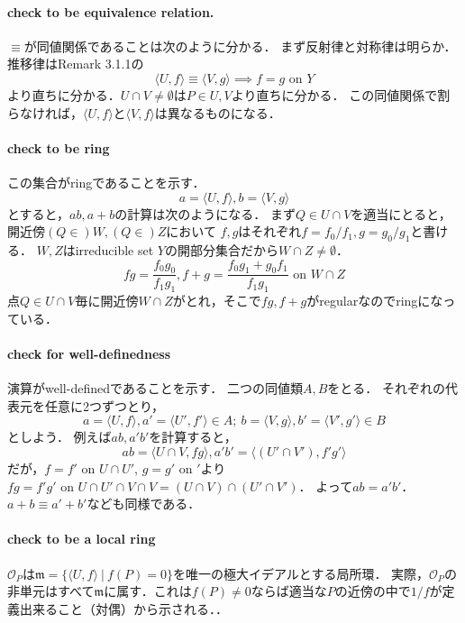 \documentclass[a4paper]{jarticle}
\newcommand{\I}[1]{\mathfrak{#1}}
\begin{document}
    \paragraph{check to be equivalence relation.}
    $\equiv$が同値関係であることは次のように分かる．
    まず反射律と対称律は明らか．
    推移律はRemark 3.1.1の
    \[ \langle U,f \rangle \equiv \langle V,g \rangle \implies f=g \mbox{ on } Y  \]
    より直ちに分かる．$U \cap V \neq \emptyset$は$P \in U, V$より直ちに分かる．
    この同値関係で割らなければ，$\langle U,f \rangle$と$\langle V,f \rangle$は異なるものになる．

    \paragraph{check to be ring}
    この集合がringであることを示す．
    \[ a=\langle U,f \rangle, b=\langle V,g \rangle \]
    とすると，$ab, a+b$の計算は次のようになる．
    まず$Q \in U \cap V$を適当にとると，開近傍$(Q \in )W, (Q \in )Z$において
    $f,g$はそれぞれ$f=f_0/f_1, g=g_0/g_1$と書ける．
    $W,Z$はirreducible set $Y$の開部分集合だから$W \cap Z \neq \emptyset$．
    \[ fg=\frac{f_0 g_0}{f_1 g_1}, f+g=\frac{f_0 g_1+g_0 f_1}{f_1 g_1} \mbox{ on } W \cap Z \]
    点$Q \in U \cap V$毎に開近傍$W \cap Z$がとれ，そこで$fg, f+g$がregularなのでringになっている．
    
    \paragraph{check for well-definedness}
    演算がwell-definedであることを示す．
    二つの同値類$A, B$をとる．
    それぞれの代表元を任意に2つずつとり，
    \[ a=\langle U,f \rangle, a'=\langle U',f' \rangle \in A;~ b=\langle V,g \rangle, b'=\langle V',g' \rangle \in B\]
    としよう．
    例えば$ab, a'b'$を計算すると，
    \[ ab=\langle U \cap V,fg \rangle, a'b'=\langle (U' \cap V'),f'g' \rangle \]
    だが，$f=f' \mbox{ on } U \cap U'$, $g=g' \mbox{ on } '$より
    $fg=f'g' \mbox{ on } U \cap U' \cap V \cap V=(U \cap V) \cap (U' \cap V')$．
    よって$ab=a'b'$．
    $a+b \equiv a'+b'$なども同様である．
    
    \paragraph{check to be a local ring}
    $\mathcal{O}_P$は$\I{m}=\{ \langle U,f \rangle ~|~ f(P)=0 \}$を唯一の極大イデアルとする局所環．
    実際，$\mathcal{O}_P$の非単元はすべて$\I{m}$に属す．これは$f(P) \neq 0$ならば適当な$P$の近傍の中で$1/f$が定義出来ること（対偶）から示される．．
\end{document}
